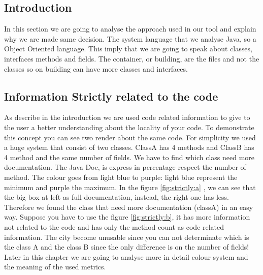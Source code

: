\documentclass[]{usiinfbachelorproject}
\begin{document}
\subsection{Introduction}
In this section we are going to analyse the approach used in our tool and explain why we are made same decision. The system language that we analyse  Java, so a Object Oriented language. This imply that we are going to speak about classes, interfaces methods and fields. The container, or building, are the files and not the classes so on building can have more classes and interfaces. 

\subsection{Information Strictly related to the code}
As describe in the introduction we are used code related information to give to the user a better understanding about the locality of your code. To demonstrate this concept you can see two render about the same code. For simplicity we used a huge system that consist of two classes. ClassA has 4 methods and ClassB has 4 method and the same number of fields. We have to find which class need more documentation. The Java Doc, is express in percentage respect the number of method. The colour goes from light blue to purple: light blue represent the minimum and purple the maximum. In the figure \ref{fig:strictly:a} , we can see that the big box at left as full documentation, instead, the right one has less. Therefore we found the class that need more documentation (classA) in an easy way. Suppose you have to use the figure \ref{fig:strictly:b}, it has more information not related to the code and has only the method count as code related information. The city become unusable since you can not determinate which is the class A and the class B since the only difference is on the number of fields! Later in this chapter we are going to analyse more in detail colour system and the meaning of the used metrics.
\end{document}
